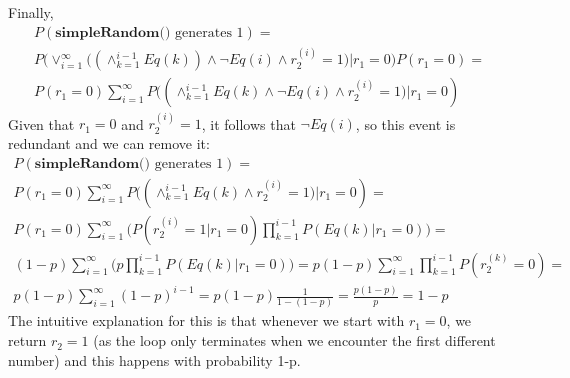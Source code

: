 \documentclass[10pt,a4paper,oneside,draft]{report}
\begin{document}
Finally, 
\begin{gather*}
P(\textbf{simpleRandom() } \text{generates 1}) = \\
P\Big( \lor_{i=1}^{\infty} \big( (\land_{k=1}^{i-1} Eq(k)) \land \neg Eq(i) \land r_2^{(i)} = 1 \big) | r_1=0 \Big) P(r_1=0) = \\
P(r_1=0) \sum_{i=1}^{\infty} P \big( (\land_{k=1}^{i-1} Eq(k) \land \neg Eq(i) \land r_2^{(i)} = 1 \big) | r_1=0)
\end{gather*}
Given that $r_1=0$ and $r_2^{(i)} = 1$, it follows that $\neg Eq(i)$, so this event is redundant and we can remove it:
\begin{gather*}
P(\textbf{simpleRandom() } \text{generates 1}) = \\
P(r_1=0) \sum_{i=1}^{\infty} P \big( (\land_{k=1}^{i-1} Eq(k) \land r_2^{(i)} = 1 \big) | r_1=0) = \\
P(r_1=0) \sum_{i=1}^{\infty} \big( P(r_2^{(i)} = 1 | r_1=0) \prod_{k=1}^{i-1} P(Eq(k) | r_1=0) \big) = \\
(1-p) \sum_{i=1}^{\infty} \big( p \prod_{k=1}^{i-1} P(Eq(k) | r_1=0) \big) = p (1-p) \sum_{i=1}^{\infty} \prod_{k=1}^{i-1} P(r_2^{(k)} = 0) = \\
p (1-p) \sum_{i=1}^{\infty} (1-p)^{i-1} = p (1-p) \frac{1}{1 - (1-p)} = \frac{p (1-p)}{p} = 1-p
\end{gather*}
The intuitive explanation for this is that whenever we start with $r_1 = 0$, we return $r_2=1$ (as the loop only terminates when we encounter the first different number) and this happens with probability 1-p. 
\end{document}
